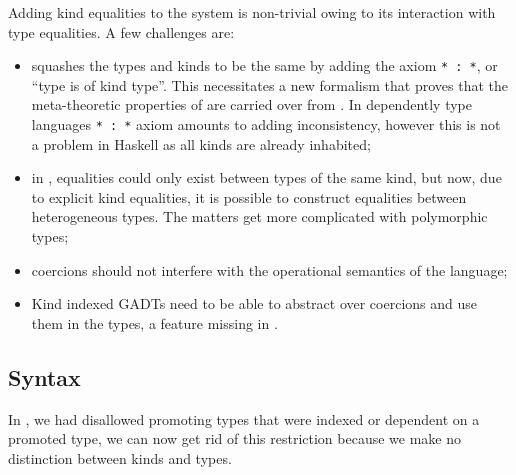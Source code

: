 \documentclass[screen,nonacm,manuscript,review]{acmart} %
\begin{document}
Adding kind equalities to the system is non-trivial owing to its interaction with type equalities. A few challenges are:
\begin{itemize}
 \item \SFK squashes the types and kinds to be the same by adding the axiom \lstinline{* : *}, or ``type is of kind type''. This necessitates a new formalism that proves that the meta-theoretic properties of \SFK are carried over from \SFC. In dependently type languages \lstinline{* : *} axiom amounts to adding inconsistency, however this is not a problem in Haskell as all kinds are already inhabited;
 \item in \SFC, equalities could only exist between types of the same kind, but now, due to explicit kind equalities, it is possible to construct equalities between heterogeneous types. The matters get more complicated with polymorphic types;
 \item coercions should not interfere with the operational semantics of the language;
 \item Kind indexed GADTs need to be able to abstract over coercions and use them in the types, a feature missing in \SFC.
\end{itemize}

\subsection{Syntax}\label{sec:sfk-syntax}
In \SFP, we had disallowed promoting types that were indexed or dependent on a promoted type, we can now get rid of this restriction because we make no distinction between kinds and types.
\end{document}
